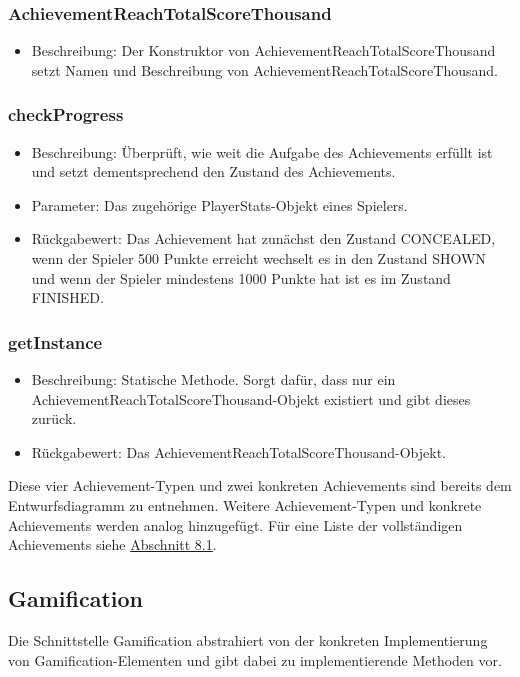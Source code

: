 \documentclass[a4paper]{scrreprt}
\begin{document}
    \subsubsection{AchievementReachTotalScoreThousand}
    \begin{itemize}
        \item Beschreibung: Der Konstruktor von AchievementReachTotalScoreThousand setzt Namen und Beschreibung von AchievementReachTotalScoreThousand.
    \end{itemize}
    \subsubsection{checkProgress}
    \begin{itemize}
        \item Beschreibung: Überprüft, wie weit die Aufgabe des Achievements erfüllt ist und setzt dementsprechend den Zustand des Achievements.
        \item Parameter: Das zugehörige PlayerStats-Objekt eines Spielers.
        \item Rückgabewert: Das Achievement hat zunächst den Zustand CONCEALED, wenn der Spieler 500 Punkte erreicht wechselt es in den Zustand SHOWN und wenn der Spieler mindestens 1000 Punkte hat ist es im Zustand FINISHED.
    \end{itemize}
    \subsubsection{getInstance}
    \begin{itemize}
        \item Beschreibung: Statische Methode. Sorgt dafür, dass nur ein AchievementReachTotalScoreThousand-Objekt existiert und gibt dieses zurück.
        \item Rückgabewert: Das AchievementReachTotalScoreThousand-Objekt.
    \end{itemize}

    \vspace{8pt}
    Diese vier Achievement-Typen und zwei konkreten Achievements sind bereits dem Entwurfsdiagramm zu entnehmen. Weitere Achievement-Typen und konkrete Achievements werden analog hinzugefügt. Für eine Liste der vollständigen Achievements siehe \hyperlink{Ach}{Abschnitt 8.1}. \\
    \vspace{8pt}


    \subsection{Gamification}
    Die Schnittstelle Gamification abstrahiert von der konkreten Implementierung von Gamification-Elementen und gibt dabei zu implementierende Methoden vor. \\
\end{document}
